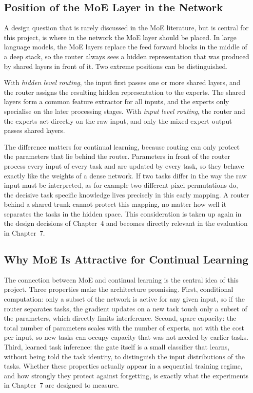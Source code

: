 \subsection{Position of the MoE Layer in the Network}
\label{sec:moeposition}

A design question that is rarely discussed in the MoE literature, but is
central for this project, is where in the network the MoE layer should be
placed. In large language models, the MoE layers replace the feed forward
blocks in the middle of a deep stack, so the router always sees a hidden
representation that was produced by shared layers in front of it. Two
extreme positions can be distinguished.

With \emph{hidden level routing}, the input first passes one or more shared
layers, and the router assigns the resulting hidden representation to the
experts. The shared layers form a common feature extractor for all inputs,
and the experts only specialise on the later processing stages. With
\emph{input level routing}, the router and the experts act directly on the
raw input, and only the mixed expert output passes shared layers.

The difference matters for continual learning, because routing can only
protect the parameters that lie behind the router. Parameters in front of
the router process every input of every task and are updated by every
task, so they behave exactly like the weights of a dense network. If two
tasks differ in the way the raw input must be interpreted, as for example
two different pixel permutations do, the decisive task specific knowledge
lives precisely in this early mapping. A router behind a shared trunk
cannot protect this mapping, no matter how well it separates the tasks in
the hidden space. This consideration is taken up again in the design
decisions of Chapter~4 and becomes directly relevant in the evaluation in
Chapter~7.

\subsection{Why MoE Is Attractive for Continual Learning}
\label{sec:whymoe}

The connection between MoE and continual learning is the central idea of
this project. Three properties make the architecture promising. First,
conditional computation: only a subset of the network is active for any
given input, so if the router separates tasks, the gradient updates on a
new task touch only a subset of the parameters, which directly limits
interference. Second, spare capacity: the total number of parameters scales
with the number of experts, not with the cost per input, so new tasks can
occupy capacity that was not needed by earlier tasks. Third, learned task
inference: the gate itself is a small classifier that learns, without being
told the task identity, to distinguish the input distributions of the
tasks. Whether these properties actually appear in a sequential training
regime, and how strongly they protect against forgetting, is exactly what
the experiments in Chapter~7 are designed to measure.
